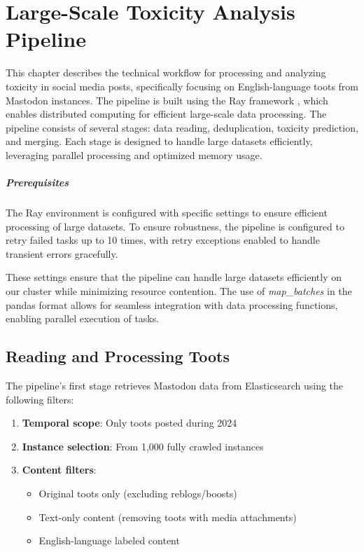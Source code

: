 \chapter{Large-Scale Toxicity Analysis Pipeline} \label{large-scale-pipeline}
This chapter describes the technical workflow for processing and analyzing toxicity in social media posts, specifically focusing on English-language toots from Mastodon instances. The pipeline is built using the Ray framework \cite{moritz:2018}, which enables distributed computing for efficient large-scale data processing. The pipeline consists of several stages: data reading, deduplication, toxicity prediction, and merging. Each stage is designed to handle large datasets efficiently, leveraging parallel processing and optimized memory usage.

\paragraph{Prerequisites}
The Ray environment is configured with specific settings to ensure efficient processing of large datasets.
To ensure robustness, the pipeline is configured to retry failed tasks up to 10 times, with retry exceptions enabled to handle transient errors gracefully.

These settings ensure that the pipeline can handle large datasets efficiently on our cluster while minimizing resource contention. The use of \textit{map\_batches} in the pandas format allows for seamless integration with data processing functions, enabling parallel execution of tasks.

\section{Reading and Processing Toots}\label{step:ingestion} 
The pipeline's first stage retrieves Mastodon data from Elasticsearch using the following filters:

\begin{enumerate}
    \item \textbf{Temporal scope}: Only toots posted during 2024
    \item \textbf{Instance selection}: From 1,000 fully crawled instances
    \item \textbf{Content filters}:
    \begin{itemize}
        \item Original toots only (excluding reblogs/boosts)
        \item Text-only content (removing toots with media attachments)
        \item English-language labeled content
    \end{itemize}
\end{enumerate}

